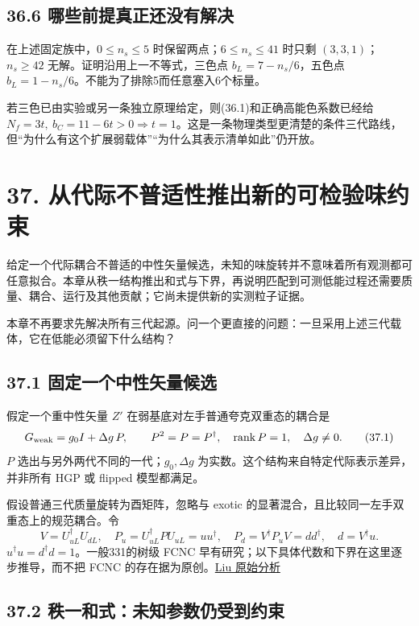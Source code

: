 \documentclass[
  11pt,
  oneside]{book}
\begin{document}
\section{36.6 哪些前提真正还没有解决}

在上述固定族中，\(0\le n_s\le5\) 时保留两点；\(6\le n_s\le41\) 时只剩
\((3,3,1)\)；\(n_s\ge42\) 无解。证明沿用上一不等式，三色点
\(b_L=7-n_s/6\)，五色点
\(b_L=1-n_s/6\)。不能为了排除5而任意塞入6个标量。

若三色已由实验或另一条独立原理给定，则(36.1)和正确高能色系数已经给
\(N_f=3t,\ b_C=11-6t>0\Rightarrow t=1\)。这是一条物理类型更清楚的条件三代路线，但``为什么有这个扩展弱载体''``为什么其表示清单如此''仍开放。

\chapter{37. 从代际不普适性推出新的可检验味约束}\label{ch-37}\hypertarget{ch-37}{}

给定一个代际耦合不普适的中性矢量候选，未知的味旋转并不意味着所有观测都可任意拟合。本章从秩一结构推出和式与下界，再说明匹配到可测低能过程还需要质量、耦合、运行及其他贡献；它尚未提供新的实测粒子证据。

本章不再要求先解决所有三代起源。问一个更直接的问题：一旦采用上述三代载体，它在低能必须留下什么结构？

\section{37.1 固定一个中性矢量候选}

假定一个重中性矢量 \(Z'\) 在弱基底对左手普通夸克双重态的耦合是 \[
G_{\rm weak}=g_0I+\Delta g\,P,\qquad P^2=P=P^\dagger,\quad
\operatorname{rank}P=1,\quad \Delta g\ne0.
\tag{37.1}
\] \(P\) 选出与另外两代不同的一代；\(g_0,\Delta g\)
为实数。这个结构来自特定代际表示差异，并非所有 HGP 或 flipped
模型都满足。

假设普通三代质量旋转为酉矩阵，忽略与 exotic
的显著混合，且比较同一左手双重态上的规范耦合。令 \[
V=U_{uL}^\dagger U_{dL},\quad
P_u=U_{uL}^\dagger PU_{uL}=uu^\dagger,\quad
P_d=V^\dagger P_uV=dd^\dagger,\quad d=V^\dagger u.
\tag{37.2}
\] \(u^\dagger u=d^\dagger d=1\)。一般331的树级 FCNC
早有研究；以下具体代数和下界在这里逐步推导，而不把 FCNC
的存在据为原创。\href{https://arxiv.org/abs/hep-ph/9312312}{Liu
原始分析}

\section{37.2 秩一和式：未知参数仍受到约束}
\end{document}
